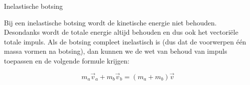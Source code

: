 \begin{app}{Inelastische botsing}
    
    Bij een inelastische botsing wordt de kinetische energie niet behouden. Desondanks wordt de totale energie altijd behouden en dus ook het vectoriële totale impuls. Als de botsing compleet inelastisch is (dus dat de voorwerpen één massa vormen na botsing), dan kunnen we de wet van behoud van impuls toepassen en de volgende formule krijgen:
    
    \begin{equation*}
        m_a\Vec{v}_a + m_b\Vec{v}_b = (m_a + m_b)\vec{v}
    \end{equation*}

\end{app}

